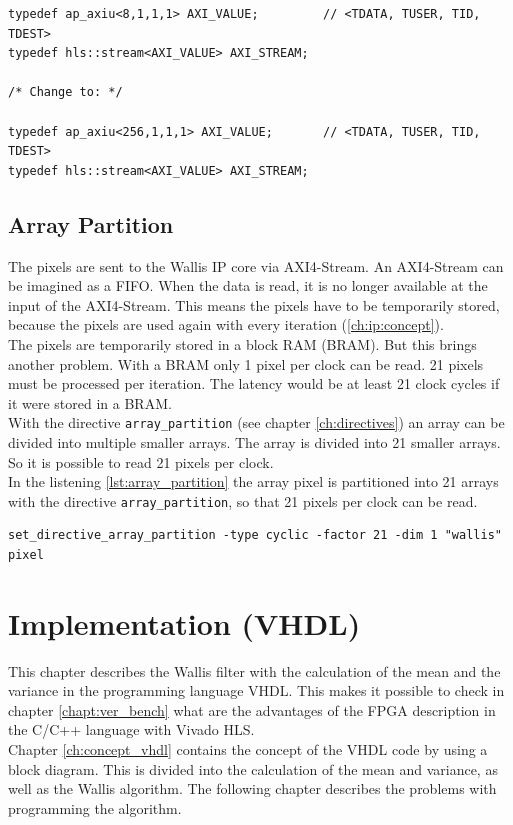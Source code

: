 \begin{minipage}{\textwidth}
\begin{lstlisting}[style=CStyle, caption=Calculation of the division for the Wallis filter, label=lst:division]
typedef ap_axiu<8,1,1,1> AXI_VALUE;			// <TDATA, TUSER, TID, TDEST>
typedef hls::stream<AXI_VALUE> AXI_STREAM;

/* Change to: */

typedef ap_axiu<256,1,1,1> AXI_VALUE;		// <TDATA, TUSER, TID, TDEST>
typedef hls::stream<AXI_VALUE> AXI_STREAM;
\end{lstlisting}
\end{minipage}

\subsection{Array Partition}
The pixels are sent to the Wallis IP core via AXI4-Stream. An AXI4-Stream can be imagined as a FIFO. When the data is read, it is no longer available at the input of the AXI4-Stream. This means the pixels have to be temporarily stored, because the pixels are used again with every iteration (\ref{ch:ip:concept}). \\
The pixels are temporarily stored in a block RAM (BRAM). But this brings another problem. With a BRAM only 1 pixel per clock can be read. 21 pixels must be processed per iteration. The latency would be at least 21 clock cycles if it were stored in a BRAM. \\
With the directive \texttt{array\_partition} (see chapter \ref{ch:directives})
an array can be divided into multiple smaller arrays. The array is divided into 21 smaller arrays. So it is possible to read 21 pixels per clock. \\
In the listening \ref{lst:array_partition} the array pixel is partitioned into 21 arrays with the directive \texttt{array\_partition}, so that 21 pixels per clock can be read. 

\begin{minipage}{\textwidth}
\begin{lstlisting}[style=TextStyle, caption=Set directive array\_partition, label=lst:array_partition]
set_directive_array_partition -type cyclic -factor 21 -dim 1 "wallis" pixel
\end{lstlisting}
\end{minipage}



\section{Implementation (VHDL)} \label{ch:ip:imp_vhdl}
This chapter describes the Wallis filter with the calculation of the mean and the variance in the programming language VHDL. This makes it possible to check in chapter \ref{chapt:ver_bench} what are the advantages of the FPGA description in the C/C++ language with Vivado HLS. \\
Chapter \ref{ch:concept_vhdl} contains the concept of the VHDL code by using a block diagram. This is divided into the calculation of the mean and variance, as well as the Wallis algorithm. The following chapter describes the problems with programming the algorithm.

